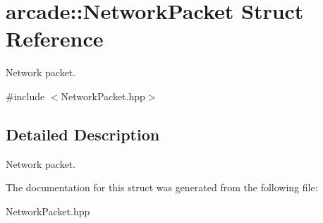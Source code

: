 \hypertarget{structarcade_1_1NetworkPacket}{}\section{arcade\+:\+:Network\+Packet Struct Reference}
\label{structarcade_1_1NetworkPacket}


Network packet.  




{\ttfamily \#include $<$Network\+Packet.\+hpp$>$}



\subsection{Detailed Description}
Network packet. 

The documentation for this struct was generated from the following file\+:\begin{DoxyCompactItemize}
\item 
Network\+Packet.\+hpp\end{DoxyCompactItemize}
